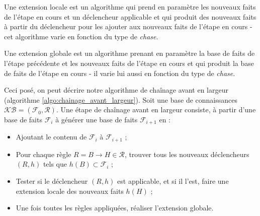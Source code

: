 \par Une extension locale est un algorithme qui prend en paramètre les nouveaux faits de l'étape en cours et un déclencheur applicable et qui produit des nouveaux faits à partir du déclencheur pour les ajouter aux nouveaux faits de l'étape en cours - cet algorithme varie en fonction du type de \textit{chase}.
\par Une extension globale est un algorithme prenant en paramètre la base de faits de l'étape précédente et les nouveaux faits de l'étape en cours et qui produit la base de faits de l'étape en cours - il varie lui aussi en fonction du type de \textit{chase}.
\par Ceci posé, on peut décrire notre algorithme de chaînage avant en largeur (algorithme  \ref{algo:chainage_avant_largeur}).
Soit une base de connaissances $\mathcal{KB} = (\mathcal{F}_0, \mathcal{R})$. Une étape de chaînage avant en largeur  consiste, à partir d'une base de faits $\mathcal{F}_i$ à générer une base de faits $\mathcal{F}_{i+1}$ en :
\begin{itemize}
    \item Ajoutant le contenu de $\mathcal{F}_{i}$ à $\mathcal{F}_{i+1}$ ;
    \item Pour chaque règle $R = B \rightarrow H \in \mathcal{R}$, trouver tous les nouveaux déclencheurs $(R,h)$ tels que $h(B) \subset \mathcal{F}_i$ ;
    \item Tester si le déclencheur $(R,h)$ est applicable, et si il l'est, faire une extension locale des nouveaux faits $h(H)$ ;
    \item Une fois toutes les règles appliquées, réaliser l'extension globale.
\end{itemize}



